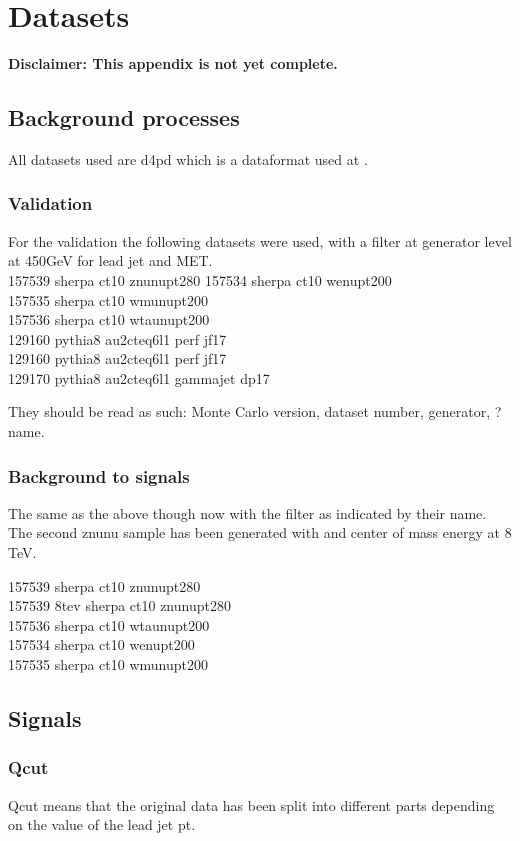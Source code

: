 \chapter{Datasets}\label{cha:datasets}
\textbf{Disclaimer: This appendix is not yet complete.}
\section{Background processes}
All datasets used are d4pd which is a dataformat used at \abbrCERN.
\subsection{Validation}
For the validation the following datasets were used, with a filter at generator level at 450GeV for lead jet and MET. \\
157539 sherpa ct10 znunupt280
157534 sherpa  ct10  wenupt200\\
157535 sherpa  ct10  wmunupt200\\
157536 sherpa  ct10  wtaunupt200\\
129160 pythia8  au2cteq6l1  perf  jf17\\
129160 pythia8  au2cteq6l1  perf  jf17\\
129170 pythia8  au2cteq6l1  gammajet  dp17

They should be read as such: Monte Carlo version, dataset number, generator, ? name.

\subsection{Background to signals}
The same as the above though now with the filter as indicated by their name. The second znunu sample has been generated with and center of mass energy at 8 TeV. 

157539 sherpa  ct10  znunupt280\\
157539 8tev  sherpa  ct10  znunupt280\\
157536 sherpa  ct10  wtaunupt200\\
157534 sherpa  ct10  wenupt200\\
157535 sherpa  ct10  wmunupt200
\section{Signals}
\subsection{Qcut}
Qcut means that the original data has been split into different parts depending on the value of the lead jet pt. 
